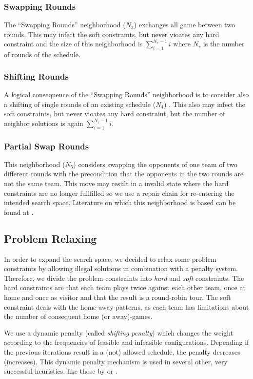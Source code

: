 \documentclass[a4paper,11pt]{article}
\begin{document}
\subsubsection{Swapping Rounds}
The ``Swapping Rounds'' neighborhood ($N_3$)  exchanges all game between two rounds. This may infect the soft constraints, but never vioates any hard constraint and the 
size of this neighborhood is $\sum_{i=1}^{N_r-1}i$ where $N_r$ is the number of rounds of the schedule.

\subsubsection{Shifting Rounds}
A logical consequence of the ``Swapping Rounds'' neighborhood is to consider also a shifting of single rounds of an existing schedule ($N_4$) . 
This also may infect the soft constraints, but never vioates any hard constraint, but the number of neighbor solutions is again $\sum_{i=1}^{N_r-1}i$.

\subsubsection{Partial Swap Rounds}
This neighborhood ($N_5$) considers swapping the opponents of one team of two different rounds with the precondition that the opponents in the 
two rounds are not the same team. This move may result in a invalid state where the hard constraints are no longer fullfilled so we use a 
repair chain for re-entering the intended search space. Literature on which this neighborhood is based can be found at \cite{Gaspero07,HentenryckV06, Chen_anant}.

\subsection{Problem Relaxing}
In order to expand the search space, we decided to relax some problem constraints by allowing illegal solutions in combination with a penalty system.
Therefore, we divide the problem constraints into \emph{hard} and \emph{soft} constraints. The hard constraints are that each team plays twice against 
each other team, once at home and once as visitor and that the result is a round-robin tour. 
The soft constraint deals with the home-away-patterns, as each team has limitations about the number of consequent home (or away)-games.

We use a dynamic penalty (called \emph{shifting penalty}) which changes the weight according to the frequencies of feasible and infeasible configurations.
 Depending if the previous iterations result in a (not) allowed schedule, the penalty decreases (increases). 
This dynamic penalty mechanism is used in several other, very successful heuristics, like those by \cite{Anagnostopoulos06} or \cite{Gaspero07}.
\end{document}
